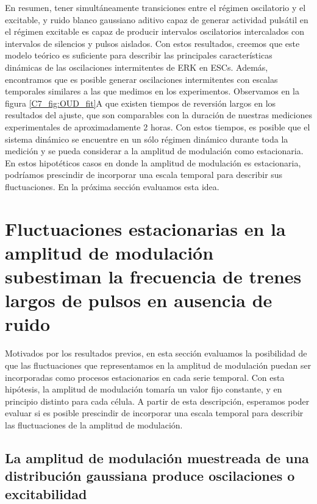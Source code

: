 \documentclass[./main.tex]{subfiles}
\begin{document}
En resumen, tener simultáneamente transiciones entre el régimen oscilatorio y el excitable, y ruido blanco gaussiano aditivo capaz de generar actividad pulsátil en el régimen excitable es capaz de producir intervalos oscilatorios intercalados con intervalos de silencios y pulsos aislados. Con estos resultados, creemos que este modelo teórico es suficiente para describir las principales características dinámicas de las oscilaciones intermitentes de ERK en ESCs. Además, encontramos que es posible generar oscilaciones intermitentes con escalas temporales similares a las que medimos en los experimentos. Observamos en la figura \ref{C7_fig:OUD_fit}A que existen tiempos de reversión largos en los resultados del ajuste, que son comparables con la duración de nuestras mediciones experimentales de aproximadamente 2 horas. Con estos tiempos, es posible que el sistema dinámico se encuentre en un sólo régimen dinámico durante toda la medición y se pueda considerar a la amplitud de modulación como estacionaria. En estos hipotéticos casos en donde la amplitud de modulación es estacionaria, podríamos prescindir de incorporar una escala temporal para describir sus fluctuaciones. En la próxima sección evaluamos esta idea.


\section{Fluctuaciones estacionarias en la amplitud de modulación subestiman la frecuencia de trenes largos de pulsos en ausencia de ruido}
\label{C7_sec:dist}

Motivados por los resultados previos, en esta sección evaluamos la posibilidad de que las fluctuaciones que representamos en la amplitud de modulación puedan ser incorporadas como procesos estacionarios en cada serie temporal. Con esta hipótesis, la amplitud de modulación tomaría un valor fijo constante, y en principio distinto para cada célula. A partir de esta descripción, esperamos poder evaluar si es posible prescindir de incorporar una escala temporal para describir las fluctuaciones de la amplitud de modulación.


\subsection{La amplitud de modulación muestreada de una distribución gaussiana produce oscilaciones o excitabilidad}
\end{document}
